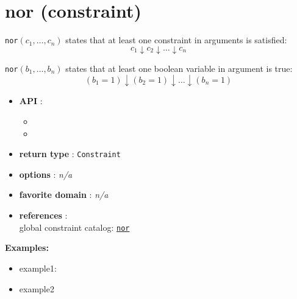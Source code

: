 \label{nor}
\hypertarget{nor}{}

\section{nor (constraint)}\label{nor:norconstraint}\hypertarget{nor:norconstraint}{}
\begin{notedef}
  \texttt{nor}$(c_1,\ldots,c_n)$ states that at least one constraint in arguments is satisfied:
$$ c_1 \downarrow c_2 \downarrow\ldots\downarrow c_n$$

  \texttt{nor}$(b_1,\ldots,b_n)$ states that at least one boolean variable in argument is true:
$$ (b_1=1) \downarrow (b_2=1) \downarrow\ldots\downarrow (b_n=1)$$
\end{notedef}

\begin{itemize}
\item \textbf{API} : 
\begin{itemize}
\item {}
\item {}
\end{itemize}
	\item \textbf{return type} : \texttt{Constraint}
	\item \textbf{options} : \emph{n/a}
	\item \textbf{favorite domain} : \emph{n/a}
	\item \textbf{references} :\\
  global constraint catalog: \href{http://www.emn.fr/z-info/sdemasse/gccat/Cnor.html}{\tt nor}
\end{itemize}

\textbf{Examples:}
\begin{itemize}
	\item example1:
\end{itemize}

\begin{itemize}
	\item example2
\end{itemize}

